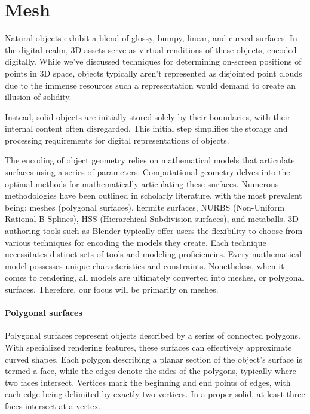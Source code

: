 \section{Mesh}

Natural objects exhibit a blend of glossy, bumpy, linear, and curved surfaces. 
In the digital realm, 3D assets serve as virtual renditions of these objects, encoded digitally. 
While we've discussed techniques for determining on-screen positions of points in 3D space, objects typically aren't represented as disjointed point clouds due to the immense resources such a representation would demand to create an illusion of solidity.

Instead, solid objects are initially stored solely by their boundaries, with their internal content often disregarded. 
This initial step simplifies the storage and processing requirements for digital representations of objects.

The encoding of object geometry relies on mathematical models that articulate surfaces using a series of parameters. 
Computational geometry delves into the optimal methods for mathematically articulating these surfaces. 
Numerous methodologies have been outlined in scholarly literature, with the most prevalent being: meshes (polygonal surfaces), hermite surfaces, NURBS (Non-Uniform Rational B-Splines), HSS (Hierarchical Subdivision surfaces), and metaballs. 
3D authoring tools such as Blender typically offer users the flexibility to choose from various techniques for encoding the models they create. 
Each technique necessitates distinct sets of tools and modeling proficiencies.
Every mathematical model possesses unique characteristics and constraints. 
Nonetheless, when it comes to rendering, all models are ultimately converted into meshes, or polygonal surfaces. 
Therefore, our focus will be primarily on meshes.

\paragraph*{Polygonal surfaces}
Polygonal surfaces represent objects described by a series of connected polygons. 
With specialized rendering features, these surfaces can effectively approximate curved shapes. 
Each polygon describing a planar section of the object's surface is termed a face, while the edges denote the sides of the polygons, typically where two faces intersect. 
Vertices mark the beginning and end points of edges, with each edge being delimited by exactly two vertices. 
In a proper solid, at least three faces intersect at a vertex.


